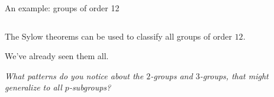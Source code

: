 \documentclass[8pt, handout]{beamer}
\begin{document}
\begin{frame}{An example: groups of order 12} %

  \vspace{5mm}

  \begin{columns}
    \begin{column}{.5\textwidth}
      The Sylow theorems can be used to classify all
      groups of order $12$. \bigskip

      We've already seen them all. \bigskip

      \emph{What patterns do you notice about the $2$-groups and $3$-groups,
      that might generalize to all $p$-subgroups?}
    \end{column}
    \begin{column}{.45\textwidth}
    \end{column}
  \end{columns}
  
  
  \vspace{-40mm}


\end{frame}
\end{document}
